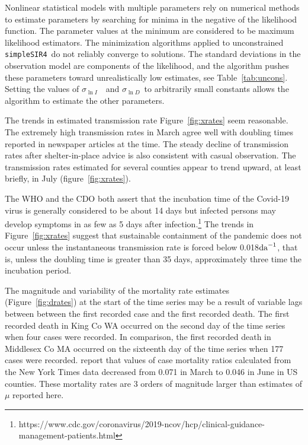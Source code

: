 \documentclass[12pt,letterpaper]{article}
\newcommand\perda{$\rm{da}^{-1}$}
\newcommand\SSm{{\tt simpleSIR4}}
\newcommand\slI{$\sigma_{\ln I}$\ }
\newcommand\slD{$\sigma_{\ln D}$}
\begin{document}
{Nonlinear statistical models with multiple parameters rely
on numerical methods to estimate parameters by searching for minima
in the negative of the likelihood
function. The parameter values at the minimum are considered to be
maximum likelihood estimators.  The minimization algorithms applied to
unconstrained \SSm\ do not reliably converge to solutions. The
standard deviations in the observation model are components of the
likelihood, and the algorithm pushes these parameters toward
unrealistically low estimates, see Table~\ref{tab:uncons}.
Setting the values of
\slI\ and \slD\ to arbitrarily small constants allows the
algorithm to estimate the other parameters.

The trends in estimated transmission rate Figure~\ref{fig:xrates} seem
reasonable. The extremely high transmission rates in March agree well
with doubling times reported in newspaper articles at the time.
The steady decline of transmission rates after shelter-in-place advice is 
also consistent with casual observation.
The transmission rates estimated for several counties appear to trend
upward, at least briefly, in July (figure~\ref{fig:xrates}). 

The WHO and the CDO both assert that
the incubation time of the Covid-19 virus is generally considered to be
about 14 days but infected persons may develop
symptoms in as few as 5 days after
infection.\footnote{https://www.cdc.gov/coronavirus/2019-ncov/hcp/clinical-guidance-management-patients.html}
The trends in Figure~\ref{fig:xrates}
suggest that sustainable containment of
the pandemic does not occur unless the instantaneous transmission rate
is forced below  0.018\perda, that is, unless the doubling
time is greater than 35 days, approximately three time the incubation
period.

The magnitude and variability of the mortality rate estimates
(Figure~\ref{fig:drates})
at the start of the time series may be a result of variable lags
between between the first recorded case and the first recorded death.
The first recorded death in King Co WA occurred on the second day of
the time series when four cases were recorded.
In comparison, the first recorded death in Middlesex Co MA occurred on
the sixteenth day of the time series when 177 cases were recorded.
\cite{Cahill2020} report that values of case mortality
ratios calculated from the New York Times data decreased from 0.071 in
March to 0.046 in June in US counties. 
These mortality rates are 3 orders of magnitude larger than
estimates of $\mu$ reported here.

}
\end{document}
